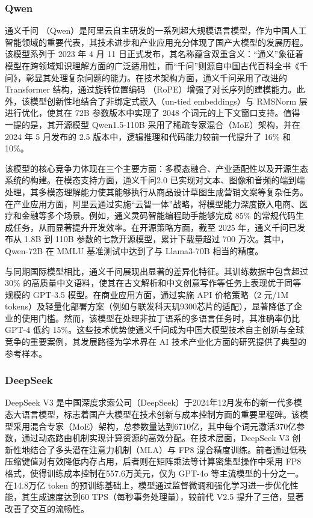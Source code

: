 \subsubsection{Qwen}
\label{sec:TOSWT-gen-qwen}

通义千问 \cite{qwen2025qwen25technicalreport}（Qwen）是阿里云自主研发的一系列超大规模语言模型，作为中国人工智能领域的重要代表，其技术进步和产业应用充分体现了国产大模型的发展历程。该模型系列于 2023 年 4 月 11 日正式发布，其名称蕴含双重含义：“通义”象征着模型在跨领域知识理解方面的广泛适用性，而“千问”则源自中国古代百科全书《千问》，彰显其处理复杂问题的能力。在技术架构方面，通义千问采用了改进的 Transformer 结构，通过旋转位置编码 \cite{su2023roformerenhancedtransformerrotary}（RoPE）增强了对长序列的建模能力。此外，该模型创新性地结合了非绑定式嵌入（un-tied embeddings）与 RMSNorm 层进行优化，使其在 72B 参数版本中实现了 2048 个词元的上下文窗口支持。值得一提的是，其开源模型 Qwen1.5-110B 采用了稀疏专家混合（MoE）架构，并在 2024 年 5 月发布的 2.5 版本中，逻辑推理和代码能力较前一代提升了 16\% 和 10\%。

该模型的核心竞争力体现在三个主要方面：多模态融合、产业适配性以及开源生态系统的构建。在模态支持方面，通义千问2.0 已实现对文本、图像和音频的端到端处理，其多模态理解能力使其能够执行从商品设计草图生成营销文案等复杂任务。在产业应用方面，阿里云通过实施“云智一体”战略，将模型能力深度嵌入电商、医疗和金融等多个场景。例如，通义灵码智能编程助手能够完成 85\% 的常规代码生成任务，从而显著提升开发效率。在开源策略方面，截至 2025 年，通义千问已发布从 1.8B 到 110B 参数的七款开源模型，累计下载量超过 700 万次。其中，Qwen-72B 在 MMLU 基准测试中达到了与 Llama3-70B 相当的精度。

与同期国际模型相比，通义千问展现出显著的差异化特征。其训练数据中包含超过 30\% 的高质量中文语料，使其在古文解析和中文创意写作等任务上表现优于同等规模的 GPT-3.5 模型。在商业应用方面，通过实施 API 价格策略（2 元/1M tokens）及轻量化部署方案（例如与联发科天玑9300芯片的适配），显著降低了企业的使用门槛。然而，该模型在处理非拉丁语系的多语言任务时，其准确率仍比 GPT-4 低约 15\%。这些技术优势使通义千问成为中国大模型技术自主创新与全球竞争的重要案例，其发展路径为学术界在 AI 技术产业化方面的研究提供了典型的参考样本。

\subsubsection{DeepSeek}
\label{sec:TOSWT-gen-ds}

DeepSeek V3 \cite{deepseekai2024deepseekv3technicalreport} 是中国深度求索公司（DeepSeek）于2024年12月发布的新一代多模态大语言模型，标志着国产大模型在技术创新与成本控制方面的重要里程碑。该模型采用混合专家（MoE）架构，总参数量达到6710亿，其中每个词元激活370亿参数，通过动态路由机制实现计算资源的高效分配。在技术层面，DeepSeek V3 创新性地结合了多头潜在注意力机制（MLA）与 FP8 混合精度训练。前者通过低秩压缩键值对有效降低内存占用，后者则在矩阵乘法等计算密集型操作中采用 FP8 格式，使得训练成本控制在557.6万美元，仅为 GPT-4o 等主流模型的十分之一。在14.8万亿 token 的预训练基础上，模型通过监督微调和强化学习进一步优化性能，其生成速度达到60 TPS（每秒事务处理量），较前代 V2.5 提升了三倍，显著改善了交互的流畅性。


